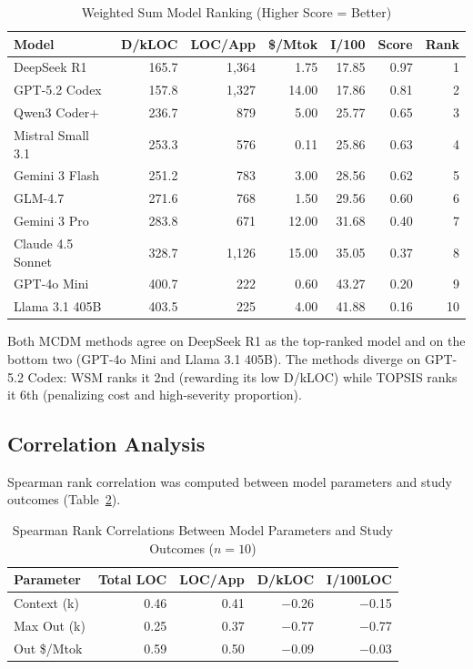 \begin{table}[htbp]
    \centering
    \caption{Weighted Sum Model Ranking (Higher Score = Better)}
    \label{tab:wsm}
    \small
    \begin{tabular}{@{} l r r r r r r @{}}
        \toprule
        \textbf{Model} & \textbf{D/kLOC} & \textbf{LOC/App} & \textbf{\$/Mtok} & \textbf{I/100} & \textbf{Score} & \textbf{Rank} \\
        \midrule
        DeepSeek R1 & 165.7 & 1{,}364 & 1.75 & 17.85 & 0.97 & 1 \\
        GPT-5.2 Codex & 157.8 & 1{,}327 & 14.00 & 17.86 & 0.81 & 2 \\
        Qwen3 Coder+ & 236.7 & 879 & 5.00 & 25.77 & 0.65 & 3 \\
        Mistral Small 3.1 & 253.3 & 576 & 0.11 & 25.86 & 0.63 & 4 \\
        Gemini 3 Flash & 251.2 & 783 & 3.00 & 28.56 & 0.62 & 5 \\
        GLM-4.7 & 271.6 & 768 & 1.50 & 29.56 & 0.60 & 6 \\
        Gemini 3 Pro & 283.8 & 671 & 12.00 & 31.68 & 0.40 & 7 \\
        Claude 4.5 Sonnet & 328.7 & 1{,}126 & 15.00 & 35.05 & 0.37 & 8 \\
        GPT-4o Mini & 400.7 & 222 & 0.60 & 43.27 & 0.20 & 9 \\
        Llama 3.1 405B & 403.5 & 225 & 4.00 & 41.88 & 0.16 & 10 \\
        \bottomrule
    \end{tabular}
\end{table}

Both MCDM methods agree on DeepSeek R1 as the top-ranked model and on the bottom two (GPT-4o Mini and Llama 3.1 405B). The methods diverge on GPT-5.2 Codex: WSM ranks it 2nd (rewarding its low D/kLOC) while TOPSIS ranks it 6th (penalizing cost and high-severity proportion).

\subsection{Correlation Analysis}

Spearman rank correlation was computed between model parameters and study outcomes (Table~\ref{tab:correlations}).

\begin{table}[htbp]
    \centering
    \caption{Spearman Rank Correlations Between Model Parameters and Study Outcomes ($n = 10$)}
    \label{tab:correlations}
    \small
    \begin{tabular}{@{} l r r r r @{}}
        \toprule
        \textbf{Parameter} & \textbf{Total LOC} & \textbf{LOC/App} & \textbf{D/kLOC} & \textbf{I/100LOC} \\
        \midrule
        Context (k) & 0.46 & 0.41 & $-$0.26 & $-$0.15 \\
        Max Out (k) & 0.25 & 0.37 & $-$0.77 & $-$0.77 \\
        Out \$/Mtok & 0.59 & 0.50 & $-$0.09 & $-$0.03 \\
        \bottomrule
    \end{tabular}
\end{table}

